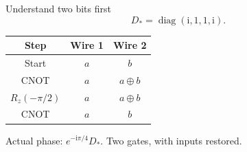 \documentclass{beamer}
\begin{document}
\begin{frame}{Understand two bits first}
\[D_* = \operatorname{diag}(\mathrm i,1,1,\mathrm i).\]
\begin{center}
\begin{tabular}{c|c|c}
Step & Wire 1 & Wire 2\\\hline
Start & $a$ & $b$\\
CNOT & $a$ & $a\oplus b$\\
$R_z(-\pi/2)$ & $a$ & $a\oplus b$\\
CNOT & $a$ & $b$
\end{tabular}
\end{center}
Actual phase: $e^{-\mathrm i\pi/4}D_*$. Two gates, with inputs restored.
\end{frame}
\end{document}
